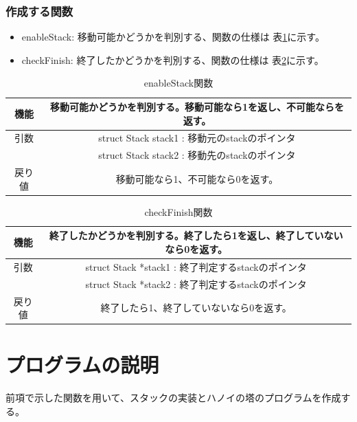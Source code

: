 \documentclass[dvipdfmx]{jsarticle}
\begin{document}
\subsubsection{作成する関数}
\begin{itemize}
  \item enableStack: 移動可能かどうかを判別する、関数の仕様は 表\ref{tab:enablestack_func}に示す。
  \item checkFinish: 終了したかどうかを判別する、関数の仕様は 表\ref{tab:checkfinish_func}に示す。
\end{itemize}
\begin{table}[ht]
  \centering
  \begin{tabular}{|c|c|}
    \hline
    機能  & 移動可能かどうかを判別する。移動可能なら1を返し、不可能ならを返す。   \\
    \hline
    引数  & struct Stack stack1 : 移動元のstackのポインタ \\
        & struct Stack stack2 : 移動先のstackのポインタ \\
    \hline
    戻り値 & 移動可能なら1、不可能なら0を返す。                   \\
    \hline
  \end{tabular}
  \caption{enableStack関数}
  \label{tab:enablestack_func}
\end{table}
\begin{table}[ht]
  \centering
  \begin{tabular}{|c|c|}
    \hline
    機能  & 終了したかどうかを判別する。終了したら1を返し、終了していないなら0を返す。  \\
    \hline
    引数  & struct Stack *stack1 : 終了判定するstackのポインタ \\
        & struct Stack *stack2 : 終了判定するstackのポインタ \\
    \hline
    戻り値 & 終了したら1、終了していないなら0を返す。                   \\
    \hline
  \end{tabular}
  \caption{checkFinish関数}
  \label{tab:checkfinish_func}
\end{table}
\section{プログラムの説明}
前項で示した関数を用いて、スタックの実装とハノイの塔のプログラムを作成する。
\end{document}
